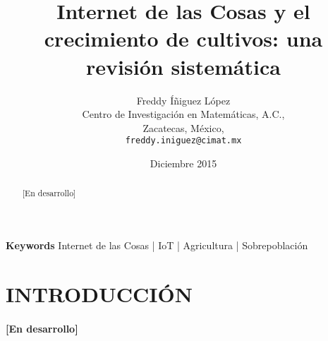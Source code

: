 \documentclass[10pt, twocolumn]{article}
\begin{document}
\title{\textbf{Internet de las Cosas y el crecimiento de cultivos: una revisión sistemática}}
\author{Freddy Íñiguez López\\
	Centro de Investigación en Matemáticas, A.C.,\\
	Zacatecas, México,\\
	\texttt{freddy.iniguez@cimat.mx}}
\date{Diciembre 2015}
\maketitle

\begin{abstract}
[En desarrollo]
\end{abstract}
\paragraph{}
\textbf{Keywords} Internet de las Cosas | IoT | Agricultura | Sobrepoblación

\section{INTRODUCCIÓN}
\paragraph{[En desarrollo]}
\end{document}
